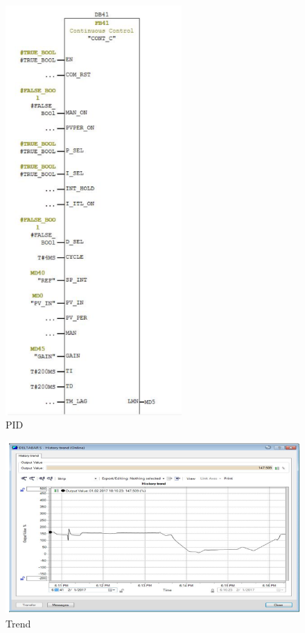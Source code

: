 \begin{figure}[!htb]
    \centering
    \includegraphics[width=0.6\textwidth]{images/bilde5}
    \caption{PID}
\end{figure}

\begin{figure}[!htb]
    \centering
    \includegraphics[width=1\textwidth]{images/bilde6}
    \caption{Trend}
\end{figure}

